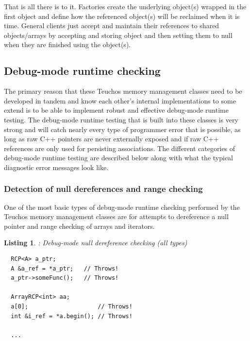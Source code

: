 \documentclass[pdf,ps2pdf,11pt]{SANDreport}
\newtheorem{listing}{Listing}
\begin{document}
That is all there is to it.  Factories create the underlying object(s)
wrapped in the first {} object and define how the
referenced object(s) will be reclaimed when it is time.  General
clients just accept and maintain their references to shared
objects/arrays by accepting and storing {} object
and then setting them to null when they are finished using the
object(s).


%
{}\subsection{Debug-mode runtime checking}
\label{sec:debug-mode-runtime-checking}
%

The primary reason that these Teuchos memory management classes need
to be developed in tandem and know each other's internal
implementations to some extend is to be able to implement robust and
effective debug-mode runtime testing.  The debug-mode runtime testing
that is built into these classes is very strong and will catch nearly
every type of programmer error that is possible, as long as raw C++
pointers are never externally exposed and if raw C++ references are
only used for persisting associations.  The different categories of
debug-mode runtime testing are described below along with what the
typical diagnostic error messages look like.


%
{}\subsubsection{Detection of null dereferences and range checking}
\label{sec:null-dereferences-range-checking}
%

One of the most basic types of debug-mode runtime checking performed
by the Teuchos memory management classes are for attempts to
dereference a null pointer and range checking of arrays and iterators.

\begin{listing}: Debug-mode null dereference checking (all types) \\
\label{listing:null-deref}
{\small\begin{verbatim}
  RCP<A> a_ptr;
  A &a_ref = *a_ptr;   // Throws!
  a_ptr->someFunc();   // Throws!

  ArrayRCP<int> aa;
  a[0];                    // Throws!
  int &i_ref = *a.begin(); // Throws!

  ...  
\end{verbatim}}
\end{listing}
\end{document}
